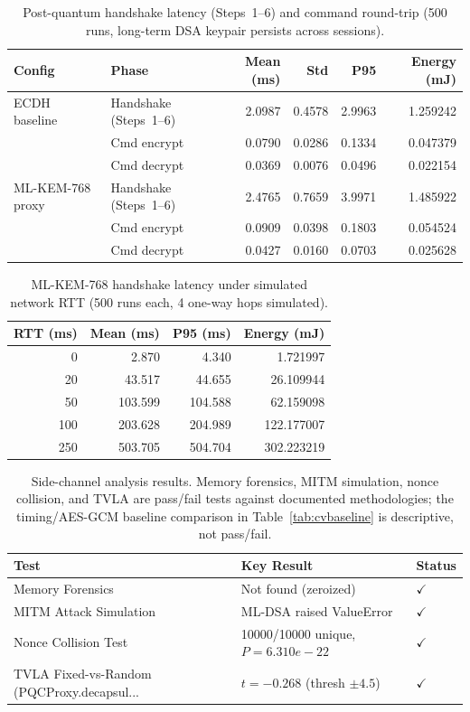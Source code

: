 \begin{table}[t]\centering
\caption{Post-quantum handshake latency (Steps~1--6) and command round-trip (500 runs, long-term DSA keypair persists across sessions).}
\label{tab:e2e}
\begin{tabular}{llrrrr}
\hline
Config & Phase & Mean (ms) & Std & P95 & Energy (mJ) \\
\hline
ECDH baseline & Handshake (Steps~1--6) & 2.0987 & 0.4578 & 2.9963 & 1.259242 \\
 & Cmd encrypt & 0.0790 & 0.0286 & 0.1334 & 0.047379 \\
 & Cmd decrypt & 0.0369 & 0.0076 & 0.0496 & 0.022154 \\
\hline
ML-KEM-768 proxy & Handshake (Steps~1--6) & 2.4765 & 0.7659 & 3.9971 & 1.485922 \\
 & Cmd encrypt & 0.0909 & 0.0398 & 0.1803 & 0.054524 \\
 & Cmd decrypt & 0.0427 & 0.0160 & 0.0703 & 0.025628 \\
\hline
\end{tabular}\end{table}

\begin{table}[t]\centering
\caption{ML-KEM-768 handshake latency under simulated network RTT (500 runs each, 4 one-way hops simulated).}
\label{tab:network}
\begin{tabular}{rrrr}
\hline
RTT (ms) & Mean (ms) & P95 (ms) & Energy (mJ) \\
\hline
0 & 2.870 & 4.340 & 1.721997 \\
20 & 43.517 & 44.655 & 26.109944 \\
50 & 103.599 & 104.588 & 62.159098 \\
100 & 203.628 & 204.989 & 122.177007 \\
250 & 503.705 & 504.704 & 302.223219 \\
\hline
\end{tabular}\end{table}

\begin{table}[t]\centering
\caption{Side-channel analysis results. Memory forensics, MITM simulation, nonce collision, and TVLA are pass/fail tests against documented methodologies; the timing/AES-GCM baseline comparison in Table~\ref{tab:cvbaseline} is descriptive, not pass/fail.}
\label{tab:sidechannel}
\begin{tabular}{lll}
\hline
Test & Key Result & Status \\
\hline
Memory Forensics & Not found (zeroized) & $\checkmark$ \\
MITM Attack Simulation & ML-DSA raised ValueError & $\checkmark$ \\
Nonce Collision Test & 10000/10000 unique, $P=6.310e-22$ & $\checkmark$ \\
TVLA Fixed-vs-Random (PQCProxy.decapsul... & $t=-0.268$ (thresh $\pm4.5$) & $\checkmark$ \\
\hline
\end{tabular}\end{table}

